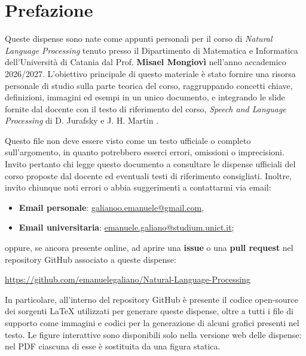 \chapter*{Prefazione}

\setlength{\parskip}{0.8em}
\setlength{\parindent}{0pt}

Queste dispense sono nate come appunti personali per il corso di \emph{Natural Language Processing} tenuto presso il Dipartimento di Matematica e Informatica dell'Universit\`a di Catania dal Prof. \textbf{Misael Mongiovì} nell'anno accademico 2026/2027. L'obiettivo principale di questo materiale è stato fornire una risorsa personale di studio sulla parte teorica del corso, raggruppando concetti chiave, definizioni, immagini ed esempi in un unico documento, e integrando le slide fornite dal docente con il testo di riferimento del corso, \textit{Speech and Language Processing} di D. Jurafsky e J. H. Martin \cite{jurafsky2026slp}.

Questo file non deve essere visto come un testo ufficiale o completo sull'argomento, in quanto potrebbero esserci errori, omissioni o imprecisioni. Invito pertanto chi legge questo documento a consultare le dispense ufficiali del corso proposte dal docente ed eventuali testi di riferimento consigliati. Inoltre, invito chiunque noti errori o abbia suggerimenti a contattarmi via email:
\begin{itemize}
    \item \textbf{Email personale}: \href{mailto:galianoo.emanuele@gmail.com}{galianoo.emanuele@gmail.com},
    \item \textbf{Email universitaria}: \href{mailto:emanuele.galiano@studium.unict.it}{emanuele.galiano@studium.unict.it};
\end{itemize}

\noindent
oppure, se ancora presente online, ad aprire una \textbf{issue} o una \textbf{pull request} nel repository GitHub associato a queste dispense:
\begin{center}
\begin{minipage}{0.92\textwidth}
\centering
\url{https://github.com/emanuelegaliano/Natural-Language-Processing}
\end{minipage}
\end{center}

In particolare, all'interno del repository GitHub è presente il codice open-source dei sorgenti \LaTeX{} utilizzati per generare queste dispense, oltre a tutti i file di supporto come immagini e codici per la generazione di alcuni grafici presenti nel testo. Le figure interattive sono disponibili solo nella versione web delle dispense: nel PDF ciascuna di esse è sostituita da una figura statica.
